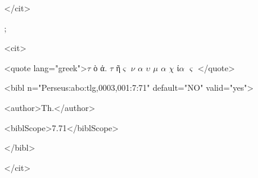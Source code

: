 \documentclass[10pt]{article}
\begin{document}
\begin{adjustwidth}{0.85in}{0.0in}
 </cit>\par

\end{adjustwidth}

\begin{adjustwidth}{0.85in}{0.0in}
 ;\par

\end{adjustwidth}

\begin{adjustwidth}{0.85in}{0.0in}
 <cit>\par

\end{adjustwidth}

\begin{adjustwidth}{0.99in}{0.0in}
 <quote lang="greek">$ \tau$ ὸ ἀ. $ \tau$ ῆ$ \varsigma $  $ \nu $ $ \alpha $ $ \upsilon $ $ \mu $ $ \alpha $ $ \chi $ ί$ \alpha $ $ \varsigma $ </quote>\par

\end{adjustwidth}

\begin{adjustwidth}{0.99in}{0.0in}
 <bibl n="Perseus:abo:tlg,0003,001:7:71" default="NO" valid="yes">\par

\end{adjustwidth}

\begin{adjustwidth}{1.12in}{0.0in}
 <author>Th.</author>\par

\end{adjustwidth}

\begin{adjustwidth}{1.12in}{0.0in}
 <biblScope>7.71</biblScope>\par

\end{adjustwidth}

\begin{adjustwidth}{0.99in}{0.0in}
 </bibl>\par

\end{adjustwidth}

\begin{adjustwidth}{0.85in}{0.0in}
 </cit>\par

\end{adjustwidth}
\end{document}
